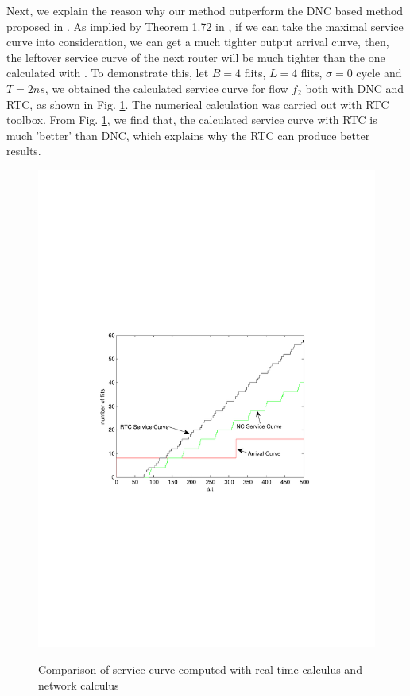 \documentclass[10pt,journal]{IEEEtran}
\begin{document}
Next, we explain the reason why our method outperform the DNC based method proposed in \cite{Qian489900}. As implied by Theorem 1.72 in \cite{Boudec2001Network}, if we can take the maximal service curve into consideration, we can get a much tighter output arrival curve, then, the leftover service curve of the next router will be much tighter than the one calculated with \cite{qian2009analysis}. To demonstrate this, let $B=4$ flits, $L=4$ flits, $\sigma=0$ cycle and $T=2ns$, we obtained the calculated service curve for flow $f_2$ both with DNC and RTC, as shown in Fig. \ref{loose}. The numerical calculation was carried out with RTC toolbox. From Fig. \ref{loose}, we find that, the calculated service curve with RTC is much 'better' than DNC, which explains why the RTC can produce better results.
\begin{figure}
  \centering
  \includegraphics[scale=0.6]{figures/loose.pdf}\\
  \caption{Comparison of service curve computed with real-time calculus and network calculus}\label{loose}
\end{figure}
\end{document}
